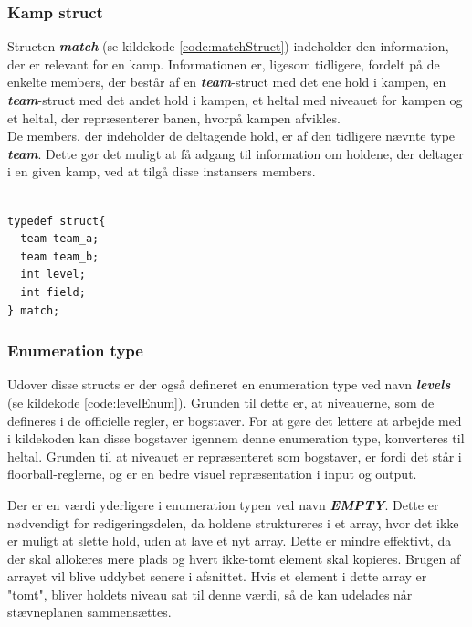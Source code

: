 \clearpage

\subsubsection{Kamp struct}
Structen \textbf{\textit{match}} (se kildekode \ref{code:matchStruct}) indeholder den information, der er relevant for en kamp. Informationen er, ligesom tidligere, fordelt på de enkelte members, der består af en \textbf{\textit{team}}-struct med det ene hold i kampen, en \textbf{\textit{team}}-struct med det andet hold i kampen, et heltal med niveauet for kampen og et heltal, der repræsenterer banen, hvorpå kampen afvikles. \\
De members, der indeholder de deltagende hold, er af den tidligere nævnte type \textbf{\textit{team}}. Dette gør det muligt at få adgang til information om holdene, der deltager i en given kamp, ved at tilgå disse instansers members.

\begin{listing} [H]
\begin{verbatim}

typedef struct{
  team team_a;
  team team_b;
  int level;
  int field;
} match;

\end{verbatim}
\label{code:matchStruct}
\end{listing}

\subsubsection{Enumeration type}
Udover disse structs er der også defineret en enumeration type ved navn \textbf{\textit{levels}} (se kildekode \ref{code:levelEnum}). Grunden til dette er, at niveauerne, som de defineres i de officielle regler, er bogstaver. For at gøre det lettere at arbejde med i kildekoden kan disse bogstaver igennem denne enumeration type, konverteres til heltal. Grunden til at niveauet er repræsenteret som bogstaver, er fordi det står i floorball-reglerne, og er en bedre visuel repræsentation i input og output. 
\par
Der er en værdi yderligere i enumeration typen ved navn \textbf{\textit{EMPTY}}. Dette er nødvendigt for redigeringsdelen, da holdene struktureres i et array, hvor det ikke er muligt at slette hold, uden at lave et nyt array. Dette er mindre effektivt, da der skal allokeres mere plads og hvert ikke-tomt element skal kopieres. Brugen af arrayet vil blive uddybet senere i afsnittet. Hvis et element i dette array er "tomt", bliver holdets niveau sat til denne værdi, så de kan udelades når stævneplanen sammensættes.

